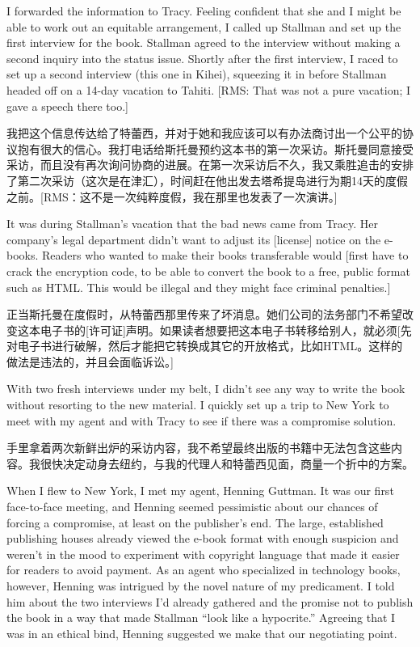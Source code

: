 \ifdefined\eng
I forwarded the information to Tracy. Feeling confident that she and I might be able to work out an equitable arrangement, I called up Stallman and set up the first interview for the book. Stallman agreed to the interview without making a second inquiry into the status issue. Shortly after the first interview, I raced to set up a second interview (this one in Kihei), squeezing it in before Stallman headed off on a 14-day vacation to Tahiti. [RMS: That was not a pure vacation; I gave a speech there too.]
\fi

\ifdefined\chs
我把这个信息传达给了特蕾西，并对于她和我应该可以有办法商讨出一个公平的协议抱有很大的信心。我打电话给斯托曼预约这本书的第一次采访。斯托曼同意接受采访，而且没有再次询问协商的进展。在第一次采访后不久，我又乘胜追击的安排了第二次采访（这次是在津汇），时间赶在他出发去塔希提岛进行为期14天的度假之前。[RMS：这不是一次纯粹度假，我在那里也发表了一次演讲。]
\fi

\ifdefined\eng
It was during Stallman's vacation that the bad news came from Tracy. Her company's legal department didn't want to adjust its [license] notice on the e-books. Readers who wanted to make their books transferable would [first have to crack the encryption code, to be able to convert the book to a free, public format such as HTML. This would be illegal and they might face criminal penalties.]
\fi

\ifdefined\chs
正当斯托曼在度假时，从特蕾西那里传来了坏消息。她们公司的法务部门不希望改变这本电子书的[许可证]声明。如果读者想要把这本电子书转移给别人，就必须[先对电子书进行破解，然后才能把它转换成其它的开放格式，比如HTML。这样的做法是违法的，并且会面临诉讼。]
\fi

\ifdefined\eng
With two fresh interviews under my belt, I didn't see any way to write the book without resorting to the new material. I quickly set up a trip to New York to meet with my agent and with Tracy to see if there was a compromise solution.
\fi

\ifdefined\chs
手里拿着两次新鲜出炉的采访内容，我不希望最终出版的书籍中无法包含这些内容。我很快决定动身去纽约，与我的代理人和特蕾西见面，商量一个折中的方案。
\fi

\ifdefined\eng
When I flew to New York, I met my agent, Henning Guttman. It was our first face-to-face meeting, and Henning seemed pessimistic about our chances of forcing a compromise, at least on the publisher's end. The large, established publishing houses already viewed the e-book format with enough suspicion and weren't in the mood to experiment with copyright language that made it easier for readers to avoid payment. As an agent who specialized in technology books, however, Henning was intrigued by the novel nature of my predicament. I told him about the two interviews I'd already gathered and the promise not to publish the book in a way that made Stallman ``look like a hypocrite.'' Agreeing that I was in an ethical bind, Henning suggested we make that our negotiating point.
\fi

